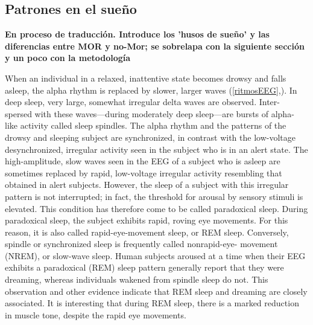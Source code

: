 

\subsection{Patrones en el sue\~no}

\textbf{En proceso de traducci\'on. Introduce los 'husos de sue\~no' y las diferencias entre MOR
y no-Mor; se sobrelapa con la siguiente secci\'on y un poco con la metodolog\'ia}

When an individual in a relaxed, inattentive state becomes drowsy and falls
asleep, the alpha rhythm is replaced by slower, larger waves 
(\ref{ritmosEEG},\cite{Jasper42}). In
deep sleep, very large, somewhat irregular delta waves are observed. Inter-
spersed with these waves—during moderately deep sleep—are bursts of alpha-
like activity called sleep spindles. The alpha rhythm and the patterns of the
drowsy and sleeping subject are synchronized, in contrast with the low-voltage
desynchronized, irregular activity seen in the subject who is in an alert state.
The high-amplitude, slow waves seen in the EEG of a subject who is asleep
are sometimes replaced by rapid, low-voltage irregular activity resembling that
obtained in alert subjects. However, the sleep of a subject with this irregular
pattern is not interrupted; in fact, the threshold for arousal by sensory stimuli is
elevated. This condition has therefore come to be called paradoxical sleep.
During paradoxical sleep, the subject exhibits rapid, roving eye movements.
For this reason, it is also called rapid-eye-movement sleep, or REM sleep.
Conversely, spindle or synchronized sleep is frequently called nonrapid-eye-
movement (NREM), or slow-wave sleep. Human subjects aroused at a time
when their EEG exhibits a paradoxical (REM) sleep pattern generally report
that they were dreaming, whereas individuals wakened from spindle sleep do
not. This observation and other evidence indicate that REM sleep and
dreaming are closely associated. It is interesting that during REM sleep, there
is a marked reduction in muscle tone, despite the rapid eye movements.

